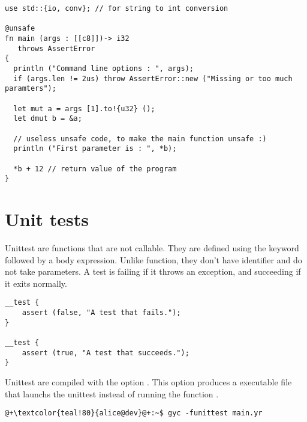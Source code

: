 \begin{lstlisting}[style=coloredverbatim, caption=The most complex main function prototype]
use std::{io, conv}; // for string to int conversion

@unsafe
fn main (args : [[c8]])-> i32
   throws AssertError
{
  println ("Command line options : ", args);
  if (args.len != 2us) throw AssertError::new ("Missing or too much paramters");

  let mut a = args [1].to!{u32} ();
  let dmut b = &a;

  // useless unsafe code, to make the main function unsafe :)
  println ("First parameter is : ", *b);

  *b + 12 // return value of the program
}
\end{lstlisting}


\vfill%
\pagebreak

\section{Unit tests}%
\label{sec:unit_test}

Unittest are functions that are not callable. They are defined using the keyword
 followed by a body expression. Unlike function, they don't
have identifier and do not take parameters. A test is failing if it throws an
exception, and succeeding if it exits normally.

\begin{lstlisting}[style=coloredverbatim]
__test {
    assert (false, "A test that fails.");
}

__test {
    assert (true, "A test that succeeds.");
}
\end{lstlisting}


Unittest are compiled with the option . This option produces
a executable file that launchs the unittest instead of running the function
.

\begin{lstlisting}[style=bashVerb, escapechar=@+]
@+\textcolor{teal!80}{alice@dev}@+:~$ gyc -funittest main.yr
\end{lstlisting}

